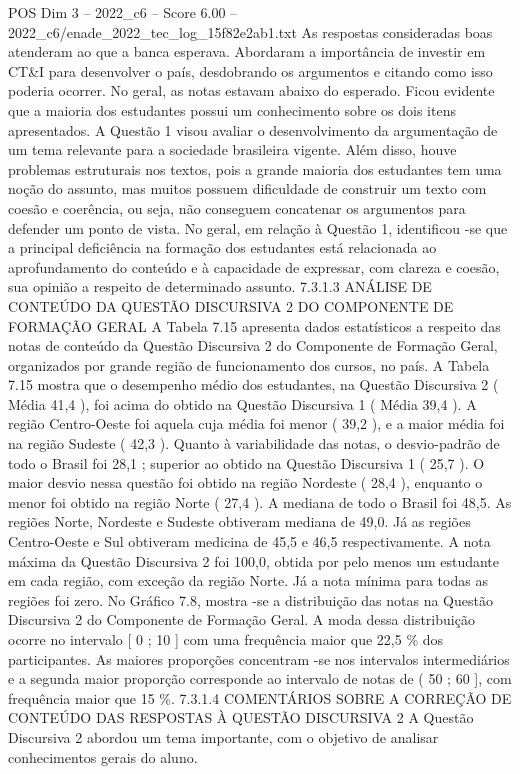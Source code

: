 \begin{textsample}{POS Dim 3 – 2022\_c6 – Score 6.00 – 2022\_c6/enade\_2022\_tec\_log\_15f82e2ab1.txt}
As respostas consideradas boas atenderam ao que a banca esperava.
Abordaram a importância de investir em CT\&I para desenvolver o país, desdobrando os argumentos e citando como isso poderia ocorrer.
No geral, as notas estavam abaixo do esperado.
Ficou evidente que a maioria dos estudantes possui um conhecimento sobre os dois itens apresentados.
A Questão 1 visou avaliar o desenvolvimento da argumentação de um tema relevante para a sociedade brasileira vigente.
Além disso, houve problemas estruturais nos textos, pois a grande maioria dos estudantes tem uma noção do assunto, mas muitos possuem dificuldade de construir um texto com coesão e coerência, ou seja, não conseguem concatenar os argumentos para defender um ponto de vista.
No geral, em relação à Questão 1, identificou -se que a principal deficiência na formação dos estudantes está relacionada ao aprofundamento do conteúdo e à capacidade de expressar, com clareza e coesão, sua opinião a respeito de determinado assunto. 7.3.1.3 ANÁLISE DE CONTEÚDO DA QUESTÃO DISCURSIVA 2 DO COMPONENTE DE FORMAÇÃO GERAL A Tabela 7.15 apresenta dados estatísticos a respeito das notas de conteúdo da Questão Discursiva 2 do Componente de Formação Geral, organizados por grande região de funcionamento dos cursos, no país.
A Tabela 7.15 mostra que o desempenho médio dos estudantes, na Questão Discursiva 2 ( Média 41,4 ), foi acima do obtido na Questão Discursiva 1 ( Média 39,4 ).
A região Centro-Oeste foi aquela cuja média foi menor ( 39,2 ), e a maior média foi na região Sudeste ( 42,3 ).
Quanto à variabilidade das notas, o desvio-padrão de todo o Brasil foi 28,1 ; superior ao obtido na Questão Discursiva 1 ( 25,7 ).
O maior desvio nessa questão foi obtido na região Nordeste ( 28,4 ), enquanto o menor foi obtido na região Norte ( 27,4 ).
A mediana de todo o Brasil foi 48,5.
As regiões Norte, Nordeste e Sudeste obtiveram mediana de 49,0.
Já as regiões Centro-Oeste e Sul obtiveram medicina de 45,5 e 46,5 respectivamente.
A nota máxima da Questão Discursiva 2 foi 100,0, obtida por pelo menos um estudante em cada região, com exceção da região Norte.
Já a nota mínima para todas as regiões foi zero.
No Gráfico 7.8, mostra -se a distribuição das notas na Questão Discursiva 2 do Componente de Formação Geral.
A moda dessa distribuição ocorre no intervalo [ 0 ; 10 ] com uma frequência maior que 22,5 \% dos participantes.
As maiores proporções concentram -se nos intervalos intermediários e a segunda maior proporção corresponde ao intervalo de notas de ( 50 ; 60 ], com frequência maior que 15 \%. 7.3.1.4 COMENTÁRIOS SOBRE A CORREÇÃO DE CONTEÚDO DAS RESPOSTAS À QUESTÃO DISCURSIVA 2 A Questão Discursiva 2 abordou um tema importante, com o objetivo de analisar conhecimentos gerais do aluno.

\end{textsample}

